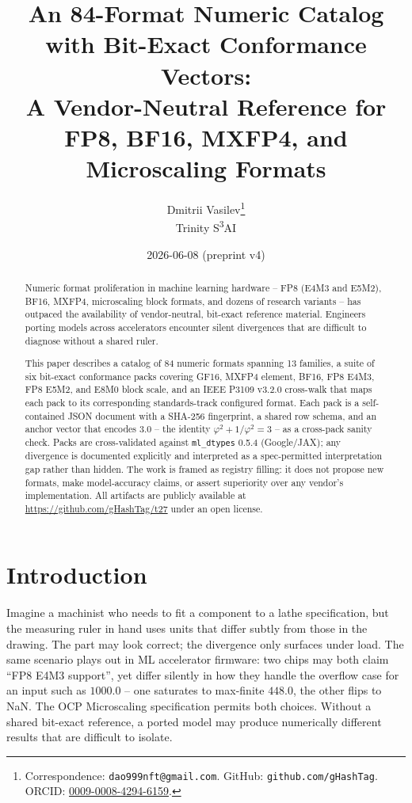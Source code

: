 \documentclass[11pt,letterpaper]{article}
\title{An 84-Format Numeric Catalog with Bit-Exact Conformance Vectors:\\
A Vendor-Neutral Reference for FP8, BF16, MXFP4, and Microscaling Formats}
\author{Dmitrii Vasilev\thanks{%
  Correspondence: \texttt{dao999nft@gmail.com}.
  GitHub: \texttt{github.com/gHashTag}.
  ORCID: \href{https://orcid.org/0009-0008-4294-6159}{0009-0008-4294-6159}.}\\
\small Trinity S\textsuperscript{3}AI}
\date{2026-06-08 (preprint v4)}
\begin{document}
\maketitle

\begin{abstract}
Numeric format proliferation in machine learning hardware -- FP8 (E4M3 and E5M2),
BF16, MXFP4, microscaling block formats, and dozens of research variants -- has
outpaced the availability of vendor-neutral, bit-exact reference material.
Engineers porting models across accelerators encounter silent divergences that
are difficult to diagnose without a shared ruler.

This paper describes a catalog of 84 numeric formats spanning 13 families, a
suite of six bit-exact conformance packs covering GF16, MXFP4 element, BF16,
FP8 E4M3, FP8 E5M2, and E8M0 block scale, and an IEEE P3109 v3.2.0 cross-walk
that maps each pack to its corresponding standards-track configured format.
Each pack is a self-contained JSON document with a SHA-256 fingerprint, a
shared row schema, and an anchor vector that encodes $3.0$ -- the identity
$\varphi^{2} + 1/\varphi^{2} = 3$ \cite{gf_arxiv} -- as a cross-pack sanity
check.  Packs are cross-validated against \texttt{ml\_dtypes} 0.5.4
(Google/JAX); any divergence is documented explicitly and interpreted as a
spec-permitted interpretation gap rather than hidden.  The work is framed as registry filling: it does not propose new
formats, make model-accuracy claims, or assert superiority over any vendor's
implementation.  All artifacts are publicly available at
\url{https://github.com/gHashTag/t27} under an open license.
\end{abstract}

\section{Introduction}
\label{sec:intro}

Imagine a machinist who needs to fit a component to a lathe specification, but
the measuring ruler in hand uses units that differ subtly from those in the
drawing.  The part may look correct; the divergence only surfaces under load.
The same scenario plays out in ML accelerator firmware: two chips may both claim
``FP8 E4M3 support'', yet differ silently in how they handle the overflow case
for an input such as $1000.0$ -- one saturates to max-finite $448.0$, the other
flips to NaN.  The OCP Microscaling specification \cite{ocp_mx} permits both
choices.  Without a shared bit-exact reference, a ported model may produce
numerically different results that are difficult to isolate.
\end{document}
